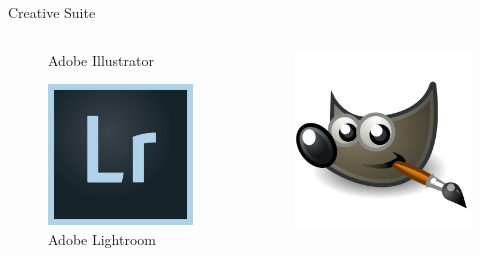 \documentclass[10pt]{beamer}
\begin{document}
\begin{frame}{Creative Suite}
\begin{columns}
\begin{column}{0.5\textwidth}
\begin{figure}
                    \caption{Adobe Illustrator}
                \end{figure}
                \begin{figure}
                    \includegraphics[height=0.12\paperheight]{images/lightroom}
                    \caption{Adobe Lightroom}
                \end{figure}
            \end{column}
            \begin{column}{0.5\textwidth}
                \begin{figure}
                    \includegraphics[height=0.12\paperheight]{images/gimp}

\end{figure}
\end{column}
\end{columns}
\end{frame}
\end{document}
